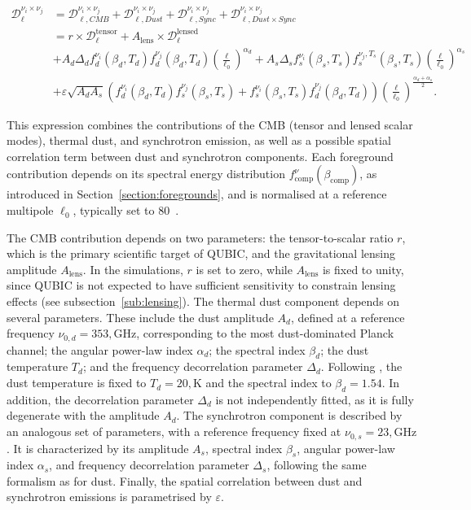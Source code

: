 \documentclass[../../thesis.tex]{subfiles}
\begin{document}
\begin{equation}
    \begin{split}
        \mathcal{D}_{\ell}^{\nu_i \times \nu_j} &= \mathcal{D}_{\ell, CMB}^{\nu_i \times \nu_j} + \mathcal{D}_{\ell, Dust}^{\nu_i \times \nu_j} + \mathcal{D}_{\ell, Sync}^{\nu_i \times \nu_j} + \mathcal{D}_{\ell, Dust\times Sync}^{\nu_i \times \nu_j} \\
        &= r \times \mathcal{D}_{\ell}^{\text{tensor}} + A_{\text{lens}} \times \mathcal{D}_{\ell}^{\text{lensed}} \\
        &+ A_d \Delta_d f_d^{\nu_i}(\beta_d, T_d) f_d^{\nu_j}(\beta_d, T_d) \left( \frac{\ell}{\ell_0} \right)^{\alpha_d} + A_s \Delta_s f_s^{\nu_i}(\beta_s, T_s) f_s^{\nu_j, T_s}(\beta_s, T_s) \left( \frac{\ell}{\ell_0} \right)^{\alpha_s} \\
        &+ \varepsilon \sqrt{A_d A_s} \left( f_d^{\nu_i}(\beta_d, T_d) f_s^{\nu_j}(\beta_s, T_s) + f_s^{\nu_i}(\beta_s, T_s) f_d^{\nu_j}(\beta_d, T_d)\right) \left( \frac{\ell}{\ell_0} \right)^{\frac{\alpha_d + \alpha_s}{2}}.
    \end{split}
\label{eq:xspec_model}
\end{equation}

This expression combines the contributions of the CMB (tensor and lensed scalar modes), thermal dust, and synchrotron emission, as well as a possible spatial correlation term between dust and synchrotron components. Each foreground contribution depends on its spectral energy distribution $f_{\mathrm{comp}}^{\nu}(\beta_{\mathrm{comp}})$, as introduced in Section~\ref{section:foregrounds}, and is normalised at a reference multipole $\ell_0$, typically set to $80$~\cite{Krachmalnicoff_2016}.

The CMB contribution depends on two parameters: the tensor-to-scalar ratio $r$, which is the primary scientific target of QUBIC, and the gravitational lensing amplitude $A_{\mathrm{lens}}$. In the simulations, $r$ is set to zero, while $A_{\mathrm{lens}}$ is fixed to unity, since QUBIC is not expected to have sufficient sensitivity to constrain lensing effects (see subsection~\ref{sub:lensing}).
The thermal dust component depends on several parameters. These include the dust amplitude $A_d$, defined at a reference frequency $\nu_{0,d} = 353,\mathrm{GHz}$, corresponding to the most dust-dominated Planck channel; the angular power-law index $\alpha_d$; the spectral index $\beta_d$; the dust temperature $T_d$; and the frequency decorrelation parameter $\Delta_d$. Following \cite{Planck2018XI}, the dust temperature is fixed to $T_d = 20,\mathrm{K}$ and the spectral index to $\beta_d = 1.54$. In addition, the decorrelation parameter $\Delta_d$ is not independently fitted, as it is fully degenerate with the amplitude $A_d$.
The synchrotron component is described by an analogous set of parameters, with a reference frequency fixed at $\nu_{0,s} = 23,\mathrm{GHz}$. It is characterized by its amplitude $A_s$, spectral index $\beta_s$, angular power-law index $\alpha_s$, and frequency decorrelation parameter $\Delta_s$, following the same formalism as for dust.
Finally, the spatial correlation between dust and synchrotron emissions is parametrised by $\varepsilon$.
\end{document}
